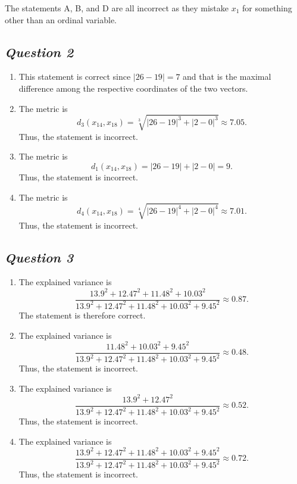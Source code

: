 \documentclass[twoside,11pt]{article}
\makeatletter
\let\@oldsubsection\subsection
\renewcommand\subsection[1]{\@oldsubsection*{\textit{#1}}}
\makeatother
\begin{document}
The statements A, B, and D are all incorrect as they mistake \(x_1\) for something other than an ordinal variable.

\subsection{Question 2}

\begin{enumerate}[label=\Alph*.]
	\item This statement is correct since \(|26 - 19| = 7\) and that is the maximal difference among the respective coordinates of the two vectors.

	\item The metric is
	\[
		d_3(x_{14}, x_{18}) = \sqrt[3]{|26 - 19|^3 + |2 - 0|^3} \approx 7.05.
	\]
	Thus, the statement is incorrect.

	\item The metric is
	\[
		d_1(x_{14}, x_{18}) = |26 - 19| + |2 - 0| = 9.
	\]
	Thus, the statement is incorrect.

	\item The metric is
	\[
		d_4(x_{14}, x_{18}) = \sqrt[4]{|26 - 19|^4 + |2 - 0|^4} \approx 7.01.
	\]
	Thus, the statement is incorrect.

\end{enumerate}

\subsection{Question 3}

\begin{enumerate}[label=\Alph*.]
	\item The explained variance is
	\[
		\frac{13.9^2 + 12.47^2 + 11.48^2 + 10.03^2}{13.9^2 + 12.47^2 + 11.48^2 + 10.03^2 + 9.45^2} \approx 0.87.
	\]
	The statement is therefore correct.

	\item The explained variance is
	\[
		\frac{11.48^2 + 10.03^2 + 9.45^2}{13.9^2 + 12.47^2 + 11.48^2 + 10.03^2 + 9.45^2} \approx 0.48.
	\]
	Thus, the statement is incorrect.

	\item The explained variance is
	\[
		\frac{13.9^2 + 12.47^2}{13.9^2 + 12.47^2 + 11.48^2 + 10.03^2 + 9.45^2} \approx 0.52.
	\]
	Thus, the statement is incorrect.

	\item The explained variance is
	\[
		\frac{13.9^2 + 12.47^2 + 11.48^2 + 10.03^2 + 9.45^2}{13.9^2 + 12.47^2 + 11.48^2 + 10.03^2 + 9.45^2} \approx 0.72.
	\]
	Thus, the statement is incorrect.

\end{enumerate}
\end{document}
